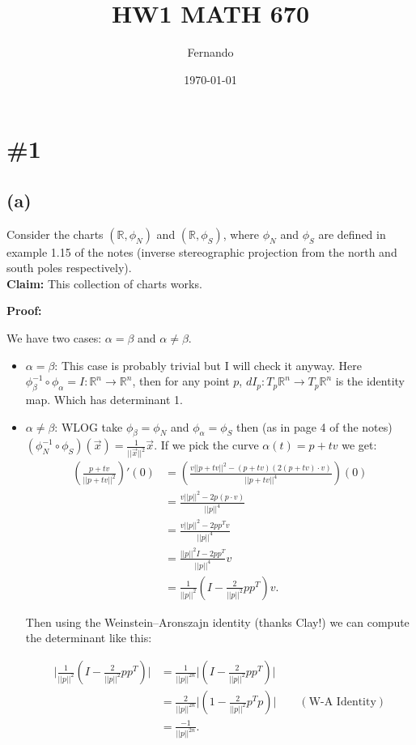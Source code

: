 \documentclass{article}
\begin{document}
\newcommand{\R}{\mathbb{R}}

\title{HW1 MATH 670}
\author{Fernando}
\date{\today}
\maketitle

\section*{\#1}
\subsection*{(a)}
Consider the charts $(\R,\phi_N)$ and
$(\R,\phi_S)$, where $\phi_N$ and $\phi_S$ are
defined in example 1.15 of the notes (inverse
stereographic projection from the north and south poles
respectively).\\
\textbf{Claim:} This collection of charts
works.

\textbf{Proof:}

We have two cases: $\alpha=\beta$ and $\alpha\neq\beta$.
\begin{itemize}
	\item $\alpha=\beta$: This case is probably
		trivial but I will check it anyway.
		Here
		$\phi_\beta^{-1}\circ\phi_\alpha=I:\R^n\to\R^n$,
		then for any point $p$,
		$dI_p:T_p\R^n\to T_p\R^n$ is the
		identity map. Which has determinant
		1.

	\item $\alpha\neq\beta$: WLOG take $\phi_\beta=\phi_N$ and
		$\phi_\alpha=\phi_S$ then (as in page 4 of the notes)
		$(\phi_N^{-1}\circ\phi_S)(\vec{x})=\frac{1}{||\vec{x}||^2}\vec{x}$.
		If we pick the curve $\alpha(t)=p+tv$ we get:
		\begin{align*}
			\left(\frac{p+tv}{||p+tv||^2}\right)'(0)
			&=\left(\frac{v||p+tv||^2-(p+tv)\left(2(p+tv)\cdot v\right)}{||p+tv||^4}\right)(0)\\
			&=\frac{v||p||^2-2p(p\cdot v)}{||p||^4}\\
			&=\frac{v||p||^2-2pp^Tv}{||p||^4}\\
			&=\frac{||p||^2I-2pp^T}{||p||^4}v\\
			&=\frac{1}{||p||^2}\left(I-\frac{2}{||p||^2}pp^T\right)v.
		\end{align*}

		Then using the Weinstein–Aronszajn
		identity (thanks Clay!) we can
		compute the determinant like this:

		\begin{align*}
\bigg|\frac{1}{||p||^2}\left(I-\frac{2}{||p||^2}pp^T\right)\bigg|
&= \frac{1}{||p||^{2n}}\bigg|\left(I-\frac{2}{||p||^2}pp^T\right)\bigg|\\
&=\frac{2}{||p||^{2n}}\bigg|\left(1-\frac{2}{||p||^2}p^Tp\right)\bigg|\qquad(\text{W-A Identity})\\
&=\frac{-1}{||p||^{2n}}.
		\end{align*}
\end{itemize}
\end{document}
